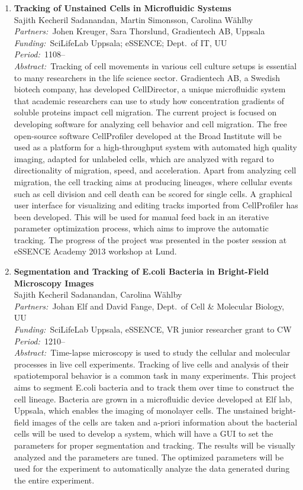 \documentclass[10pt, a4paper]{article}
\newcommand{\aabstract}[1]{\emph{Abstract:~}#1}
\newcommand{\ffunding}[1]{\emph{Funding:~}#1\\}
\newcommand{\ppartners}[1]{\emph{Partners:~}#1\\}
\newcommand{\pperiod}[1]{\emph{Period:~}#1\\}
\begin{document}
\begin{enumerate}
\item 
\textbf{Tracking of Unstained Cells in Microfluidic Systems}\\
Sajith Kecheril Sadanandan, Martin Simonsson, Carolina W\"{a}hlby\\
\ppartners{Johen Kreuger, Sara Thorslund, Gradientech AB, Uppsala }
\ffunding{SciLifeLab Uppsala; eSSENCE; Dept.~of IT, UU}
\pperiod{1108--}
\aabstract{Tracking of cell movements in various cell culture setups is essential to many researchers in the life science sector. Gradientech AB, a Swedish biotech company, has developed CellDirector, a unique microfluidic system that academic researchers can use to study how concentration gradients of soluble proteins impact cell migration. The current project is focused on developing software for analyzing cell behavior and cell migration. The free open-source software CellProfiler developed at the Broad Institute will be used as a platform for a high-throughput system with automated high quality imaging, adapted for unlabeled cells, which are analyzed with regard to directionality of migration, speed, and acceleration. Apart from analyzing cell migration, the cell tracking aims at producing lineages, where cellular events such as cell division and cell death can be scored for single cells. A graphical user interface for visualizing and editing tracks imported from CellProfiler has been developed. This will be used for manual feed back in an iterative parameter optimization process, which aims to improve the automatic tracking. The progress of the project was presented in the poster session at eSSENCE Academy 2013 workshop at Lund.}


\item 
\textbf{Segmentation and Tracking of E.coli Bacteria in Bright-Field Microscopy Images}\\
Sajith Kecheril Sadanandan, Carolina W\"{a}hlby\\
\ppartners{Johan Elf and David Fange, Dept.~of Cell \& Molecular Biology, UU}
\ffunding{SciLifeLab Uppsala, eSSENCE, VR junior researcher grant to CW}
\pperiod{1210--}
\aabstract{Time-lapse microscopy is used to study the cellular and molecular processes in live cell experiments. Tracking of live cells and analysis of their spatiotemporal behavior is a common task in many experiments. This project aims to segment E.coli bacteria and to track them over time to construct the cell lineage. Bacteria are grown in a microfluidic device developed at Elf lab, Uppsala, which enables the imaging of monolayer cells.  The unstained bright-field images of the cells are taken and a-priori information about the bacterial cells will be used to develop a system, which will have a GUI to set the parameters for proper segmentation and tracking. The results will be visually analyzed and the parameters are tuned. The optimized parameters will be used for the experiment to automatically analyze the data generated during the entire experiment.}


\end{enumerate}
\end{document}
